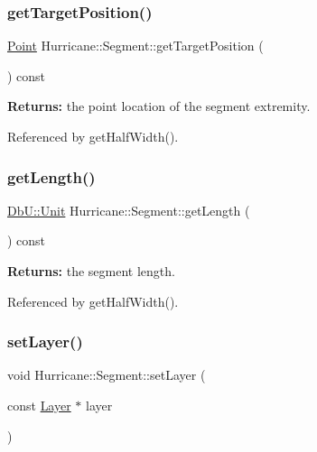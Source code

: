 \subsubsection{\texorpdfstring{get\+Target\+Position()}{getTargetPosition()}}
{\footnotesize\ttfamily \hyperlink{classHurricane_1_1Point}{Point} Hurricane\+::\+Segment\+::get\+Target\+Position (\begin{DoxyParamCaption}{ }\end{DoxyParamCaption}) const\hspace{0.3cm}{\ttfamily [virtual]}}

{\bfseries Returns\+:} the point location of the segment extremity. 

Referenced by get\+Half\+Width().

\mbox{\label{classHurricane_1_1Segment_a9f6c42c2de0330aa6a486cdbf550cea1}} 
\subsubsection{\texorpdfstring{get\+Length()}{getLength()}}
{\footnotesize\ttfamily \hyperlink{group__DbUGroup_ga4fbfa3e8c89347af76c9628ea06c4146}{Db\+U\+::\+Unit} Hurricane\+::\+Segment\+::get\+Length (\begin{DoxyParamCaption}{ }\end{DoxyParamCaption}) const\hspace{0.3cm}{\ttfamily [pure virtual]}}

{\bfseries Returns\+:} the segment length. 

Referenced by get\+Half\+Width().

\mbox{\label{classHurricane_1_1Segment_acd0b0cd25c824ba7f3b1ff2776c97cf1}} 
\subsubsection{\texorpdfstring{set\+Layer()}{setLayer()}}
{\footnotesize\ttfamily void Hurricane\+::\+Segment\+::set\+Layer (\begin{DoxyParamCaption}\item[{const \hyperlink{classHurricane_1_1Layer}{Layer} $\ast$}]{layer }\end{DoxyParamCaption})}

